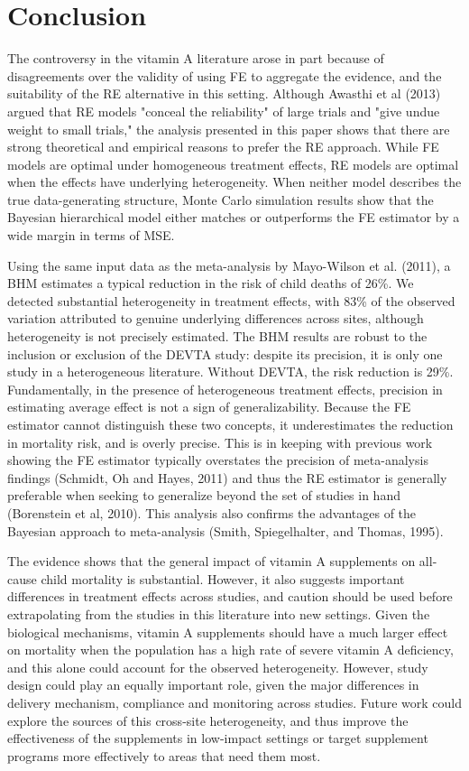 \documentclass[12pt]{article}
\begin{document}
\section{Conclusion}

The controversy in the vitamin A literature arose in part because of disagreements over the validity of using FE to aggregate the evidence, and the suitability of the RE alternative in this setting. Although Awasthi et al (2013) argued that RE models "conceal the reliability" of large trials and "give undue weight to small trials," the analysis presented in this paper shows that there are strong theoretical and empirical reasons to prefer the RE approach. While FE models are optimal under homogeneous treatment effects, RE models are optimal when the effects have underlying heterogeneity. When neither model describes the true data-generating structure, Monte Carlo simulation results show that the Bayesian hierarchical model either matches or outperforms the FE estimator by a wide margin in terms of MSE.

Using the same input data as the meta-analysis by Mayo-Wilson et al. (2011), a BHM estimates a typical reduction in the risk of child deaths of 26\%. 
We detected substantial heterogeneity in treatment effects, with 83\% of the observed variation attributed to genuine underlying differences across sites, although heterogeneity is not precisely estimated. The BHM results are robust to the inclusion or exclusion of the DEVTA study: despite its precision, it is only one study in a heterogeneous literature. Without DEVTA, the risk reduction is 29\%. 
Fundamentally, in the presence of heterogeneous treatment effects, precision in estimating average effect is not a sign of generalizability. 
Because the FE estimator cannot distinguish these two concepts, it underestimates the reduction in mortality risk, and is overly precise. 
This is in keeping with previous work showing the FE estimator typically overstates the precision of meta-analysis findings (Schmidt, Oh and Hayes, 2011) and thus the RE estimator is generally preferable when seeking to generalize beyond the set of studies in hand (Borenstein et al, 2010). 
This analysis also confirms the advantages of the Bayesian approach to meta-analysis (Smith, Spiegelhalter, and Thomas, 1995).

The evidence shows that the general impact of vitamin A supplements on all-cause child mortality is substantial. However, it also suggests important differences in treatment effects across studies, and caution should be used before extrapolating from the studies in this literature into new settings. Given the biological mechanisms, vitamin A supplements should have a much larger effect on mortality when the population has a high rate of severe vitamin A deficiency, and this alone could account for the observed heterogeneity. However, study design could play an equally important role, given the major differences in delivery mechanism, compliance and monitoring across studies. Future work could explore the sources of this cross-site heterogeneity, and thus improve the effectiveness of the supplements in low-impact settings or target supplement programs more effectively to areas that need them most.
\end{document}
